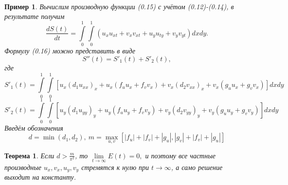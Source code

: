 \documentclass[9pt, a4paper]{extarticle}
\newtheorem*{theorem*}{Теорема}
\newtheorem{sample}{Пример}
\numberwithin{equation}{section}
\numberwithin{lemma}{section}
\numberwithin{definition}{section}
\numberwithin{notabene}{section}
\numberwithin{corollary}{section}
\begin{document}
\begin{sample}
		Вычислим производную функции (0.15) с учётом (0.12)-(0.14), в результате получим 
		\begin{equation}
			\dfrac{dS(t)}{dt} = \int\limits_0^1 \int\limits_0^1 \left(u_x u_{xt} + v_xv_{xt} + u_yu_{ty} + v_yv_{yt}\right)dxdy.
		\end{equation}
		Формулу (0.16) можно представить в виде 
		\begin{equation*}
			S''(t) = S'_1(t) + S'_2(t), 
		\end{equation*}
		где 
		\begin{equation}
			S'_1(t) = \int\limits_0^1 \int\limits_0^1 \left[u_x\left(d_1 u_{xx}\right)_x + u_x\left(f_uu_x + f_vv_x\right)+v_x\left(d_2v_{xx}\right)_x + v_x \left(g_uu_x + g_vv_x\right)\right]dxdy 
		\end{equation}
		\begin{equation}
			S'_2(t) = \int\limits_0^1 \int\limits_0^1 \left[u_y\left(d_1 u_{yy}\right)_y + u_y\left(f_uu_y + f_vv_y\right)+v_y\left(d_2v_{yy}\right)_y + v_y \left(g_uu_y + g_vv_y\right)\right]dxdy 
		\end{equation}
		Введём обозначения 
		\begin{equation}
			d = \min{(d_1, d_2)}, \ m = \max\limits_{u,v} \left[|f_u| + |f_v| + |g_u|, |g_v| + |f_v| + |g_u|\right]
		\end{equation}
	\end{sample}
	\begin{theorem*}
		Если $d > \frac{m}{\pi^2}$, то $\lim\limits_{t\to \infty} E(t) = 0, $ и поэтому все частные производные $u_x, v_x, u_y, v_y$ стремятся к нулю при $t \to \infty$, а само решение выходит на константу.
	\end{theorem*}
\end{document}
